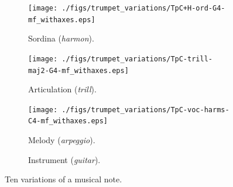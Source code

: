 \documentclass{article}
\begin{document}
\begin{figure}
        
        \begin{subfigure}[b]{0.25\textwidth}
                \centering
                \texttt{[image: ./figs/trumpet\_variations/TpC+H-ord-G4-mf\_withaxes.eps]}
                \caption{Sordina (\emph{harmon}).}
                \label{fig:TpC+H-ord-G4-mf_withaxes}
        \end{subfigure}%
        \begin{subfigure}[b]{0.25\textwidth}
                \centering
                \texttt{[image: ./figs/trumpet\_variations/TpC-trill-maj2-G4-mf\_withaxes.eps]}
                \caption{Articulation (\emph{trill}).}
                \label{fig:TpC-trill-maj2-G4-mf_withaxes}
        \end{subfigure}
        
        
        \begin{subfigure}[b]{0.25\textwidth}
                \centering
                \texttt{[image: ./figs/trumpet\_variations/TpC-voc-harms-C4-mf\_withaxes.eps]}
                \caption{Melody (\emph{arpeggio}).}
                \label{fig:TpC+voc-harms-G4-mf_withaxes}
        \end{subfigure}%
        \begin{subfigure}[b]{0.25\textwidth}
                \centering
                \caption{Instrument (\emph{guitar}).}
                \label{fig:TpC-trill-maj2-G4-mf_withaxes}
        \end{subfigure}
        \caption{Ten variations of a musical note.}\label{fig:trumpet-variations}
\end{figure}
\end{document}
